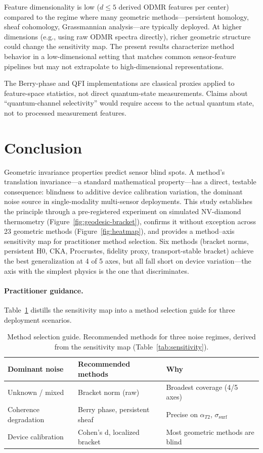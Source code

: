 \documentclass[11pt]{article}
\begin{document}
Feature dimensionality is low ($d \leq 5$ derived ODMR features per
center) compared to the regime where many geometric methods---persistent
homology, sheaf cohomology, Grassmannian analysis---are typically
deployed.  At higher dimensions (e.g., using raw ODMR spectra directly),
richer geometric structure could change the sensitivity map.  The
present results characterize method behavior in a low-dimensional
setting that matches common sensor-feature pipelines but may not
extrapolate to high-dimensional representations.

The Berry-phase and QFI implementations are classical proxies applied to
feature-space statistics, not direct quantum-state measurements.  Claims
about ``quantum-channel selectivity'' would require access to the actual
quantum state, not to processed measurement features.

\section{Conclusion}
\label{sec:conclusion}

Geometric invariance properties predict sensor blind spots.  A
method's translation invariance---a standard mathematical
property---has a direct, testable consequence: blindness to additive
device calibration variation, the dominant noise source in
single-modality multi-sensor deployments.  This study establishes the
principle through a pre-registered experiment on simulated NV-diamond
thermometry (Figure~\ref{fig:geodesic-bracket}), confirms it without
exception across 23 geometric methods
(Figure~\ref{fig:heatmap}), and provides a method--axis sensitivity map
for practitioner method selection.  Six methods (bracket norms,
persistent H0, CKA, Procrustes, fidelity proxy, transport-stable
bracket) achieve the best generalization at 4 of 5 axes, but all fall
short on device variation---the axis with the simplest physics is the
one that discriminates.

\paragraph{Practitioner guidance.}
Table~\ref{tab:guide} distills the sensitivity map into a method
selection guide for three deployment scenarios.

\begin{table}[h]
\centering
\caption{Method selection guide.  Recommended methods for three
  noise regimes, derived from the sensitivity map
  (Table~\ref{tab:sensitivity}).}
\label{tab:guide}
\small
\begin{tabular}{@{}lll@{}}
\toprule
Dominant noise & Recommended methods & Why \\
\midrule
Unknown / mixed & Bracket norm (raw) & Broadest coverage (4/5 axes) \\
Coherence degradation & Berry phase, persistent sheaf & Precise on $\alpha_{T2}$, $\sigma_\text{surf}$ \\
Device calibration & Cohen's d, localized bracket & Most geometric methods are blind \\
\bottomrule
\end{tabular}
\end{table}
\end{document}

